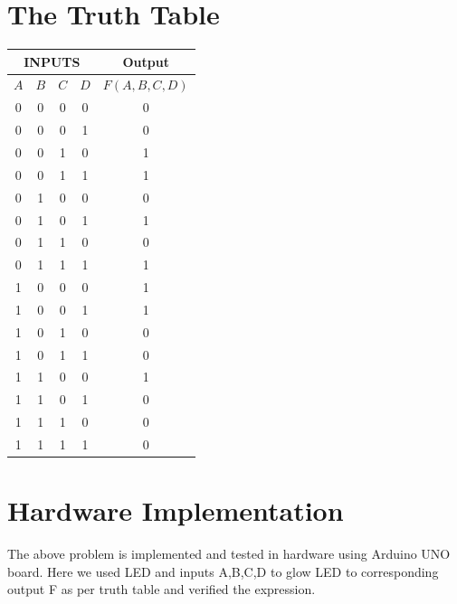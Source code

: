 \documentclass[a4paper,12pt]{article}
\begin{document}
\section*{\textbf{The Truth Table}}
\begin{center}
\begin{tabular}{|c|c|c|c|c|}
\hline
	\multicolumn{4}{|c|}{\textbf{INPUTS}} & \textbf{Output} \\ 
\hline
	$A$ & $B$ & $C$ & $D$ & $F(A,B,C,D)$ \\
\hline
0 & 0 & 0 & 0 & 0 \\ 
0 & 0 & 0 & 1 & 0 \\ 
0 & 0 & 1 & 0 & 1 \\ 
0 & 0 & 1 & 1 & 1 \\ 
0 & 1 & 0 & 0 & 0 \\ 
0 & 1 & 0 & 1 & 1 \\ 
0 & 1 & 1 & 0 & 0 \\ 
0 & 1 & 1 & 1 & 1 \\ 
1 & 0 & 0 & 0 & 1 \\ 
1 & 0 & 0 & 1 & 1 \\ 
1 & 0 & 1 & 0 & 0 \\ 
1 & 0 & 1 & 1 & 0 \\ 
1 & 1 & 0 & 0 & 1 \\ 
1 & 1 & 0 & 1 & 0 \\ 
1 & 1 & 1 & 0 & 0 \\ 
1 & 1 & 1 & 1 & 0 \\ 
\hline
\end{tabular}
\end{center}
\section*{\textbf{Hardware Implementation}}
The above problem is implemented and tested in hardware using Arduino UNO board. Here we used LED and inputs A,B,C,D to glow LED to corresponding output F as per truth table and verified the expression.
\end{document}
